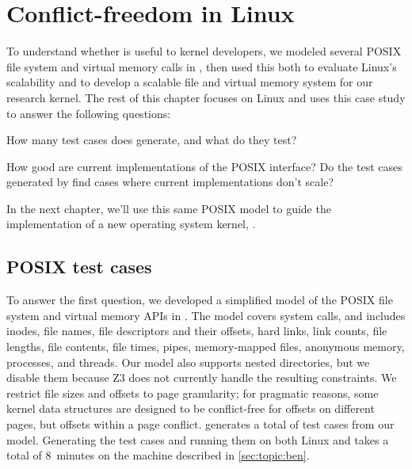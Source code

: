 \section{Conflict-freedom in Linux}
\label{sec:topic:model}

To understand whether \tool{} is useful to kernel developers,
we modeled several POSIX file system and virtual memory calls in \tool,
then used this both to evaluate Linux's scalability and to develop a
scalable file and virtual memory system for our \sys research kernel.
%
The rest of this chapter focuses on Linux and uses this case study to
answer the following questions:

\begin{CompactItemize}

\item How many test cases does \tool{} generate, and what do they test?

\item How good are current implementations of the POSIX interface?
      Do the test cases generated by \tool{} find
      cases where current implementations don't scale?

\end{CompactItemize}

In the next chapter, we'll use this same POSIX model to guide the
implementation of a new operating system kernel, \sys.

\subsection{POSIX test cases}

To answer the first question, we developed a simplified model of the
POSIX file system and virtual memory APIs in \tool{}.  The model covers
 system
calls, and includes inodes, file
names, file descriptors and their offsets, hard links, link counts,
file lengths, file contents, file times, pipes, memory-mapped files,
anonymous memory, processes, and threads.  Our model
also supports nested
directories, but we disable them because Z3 does not currently handle
the resulting constraints.
%
We restrict file sizes and offsets to page granularity; for pragmatic
reasons, some kernel data structures are designed to be conflict-free
for offsets on different pages, but
offsets within a page conflict.
%
\tool generates a total of  test cases
from our model.
%
Generating the test cases and running them on both Linux and \sys
takes a total of 8~minutes on the machine described in
\cref{sec:topic:ben}.

